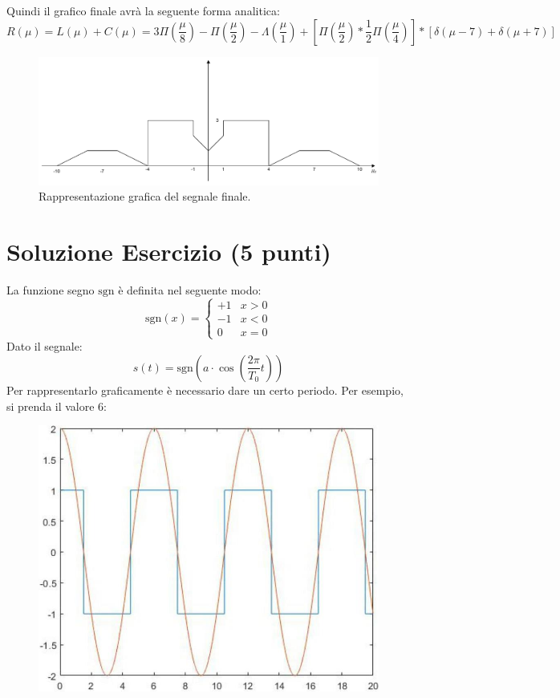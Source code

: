 \documentclass[a4paper]{article}
\begin{document}
	\noindent
	Quindi il grafico finale avrà la seguente forma analitica:
	\begin{equation*}
		R\left(\mu\right) = L\left(\mu\right) + C\left(\mu\right) = 3\Pi\left(\dfrac{\mu}{8}\right) - \Pi\left(\dfrac{\mu}{2}\right) - \Lambda\left(\dfrac{\mu}{1}\right) + \left[\Pi\left(\dfrac{\mu}{2}\right) * \dfrac{1}{2}\Pi\left(\dfrac{\mu}{4}\right)\right] * \left[\delta\left(\mu - 7\right) + \delta\left(\mu + 7\right)\right]
	\end{equation*}
	
	\begin{figure}[!htp]
		\centering
		\includegraphics[width=\textwidth]{img/fig_7.pdf}
		\caption*{Rappresentazione grafica del segnale finale.}
	\end{figure}\newpage

	\section{Soluzione Esercizio (5 punti)}
	
	La funzione segno $\mathrm{sgn}$ è definita nel seguente modo:
	\begin{equation*}
		\mathrm{sgn}\left(x\right) = \begin{cases}
			+1 & x>0 \\
			-1 & x<0 \\
			0  & x=0
		\end{cases}
	\end{equation*}
	Dato il segnale:
	\begin{equation*}
		s\left(t\right) = \mathrm{sgn}\left(a \cdot \cos\left(\dfrac{2\pi}{T_{0}}t\right)\right)
	\end{equation*}
	Per rappresentarlo graficamente è necessario dare un certo periodo. Per esempio, si prenda il valore $6$:
	\begin{figure}[!htp]
		\centering
		\includegraphics[width=.8\textwidth]{img/fig_8.png}
	\end{figure}
	
\end{document}
